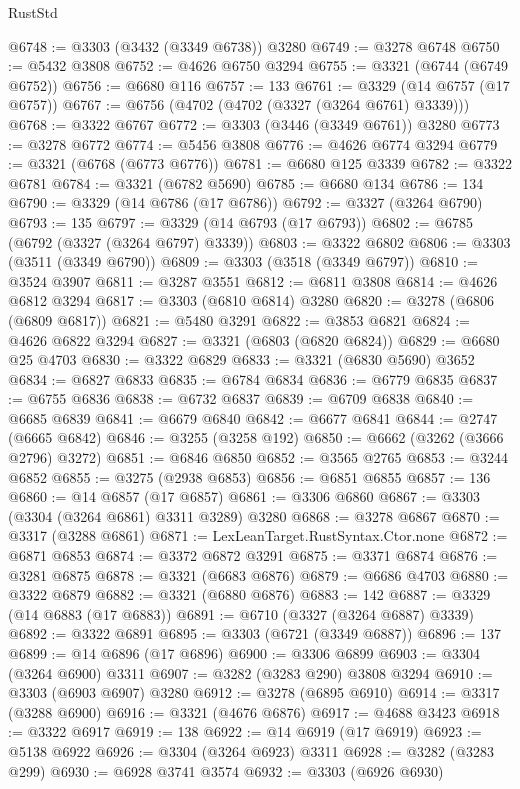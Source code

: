 \begin{lexlean}{RustStd}
\begin{coremodule}
{\begin{coremodule}
{{{{{{{{{{{{{{{{{{{{{{{{{{{{{{{{{@6748 := @3303 (@3432 (@3349 @6738)) @3280
@6749 := @3278 @6748
@6750 := @5432 @3808
@6752 := @4626 @6750 @3294
@6755 := @3321 (@6744 (@6749 @6752))
@6756 := @6680 @116
@6757 := 133
@6761 := @3329 (@14 @6757 (@17 @6757))
@6767 := @6756 (@4702 (@4702 (@3327 (@3264 @6761) @3339)))
@6768 := @3322 @6767
@6772 := @3303 (@3446 (@3349 @6761)) @3280
@6773 := @3278 @6772
@6774 := @5456 @3808
@6776 := @4626 @6774 @3294
@6779 := @3321 (@6768 (@6773 @6776))
@6781 := @6680 @125 @3339
@6782 := @3322 @6781
@6784 := @3321 (@6782 @5690)
@6785 := @6680 @134
@6786 := 134
@6790 := @3329 (@14 @6786 (@17 @6786))
@6792 := @3327 (@3264 @6790)
@6793 := 135
@6797 := @3329 (@14 @6793 (@17 @6793))
@6802 := @6785 (@6792 (@3327 (@3264 @6797) @3339))
@6803 := @3322 @6802
@6806 := @3303 (@3511 (@3349 @6790))
@6809 := @3303 (@3518 (@3349 @6797))
@6810 := @3524 @3907
@6811 := @3287 @3551
@6812 := @6811 @3808
@6814 := @4626 @6812 @3294
@6817 := @3303 (@6810 @6814) @3280
@6820 := @3278 (@6806 (@6809 @6817))
@6821 := @5480 @3291
@6822 := @3853 @6821
@6824 := @4626 @6822 @3294
@6827 := @3321 (@6803 (@6820 @6824))
@6829 := @6680 @25 @4703
@6830 := @3322 @6829
@6833 := @3321 (@6830 @5690) @3652
@6834 := @6827 @6833
@6835 := @6784 @6834
@6836 := @6779 @6835
@6837 := @6755 @6836
@6838 := @6732 @6837
@6839 := @6709 @6838
@6840 := @6685 @6839
@6841 := @6679 @6840
@6842 := @6677 @6841
@6844 := @2747 (@6665 @6842)
@6846 := @3255 (@3258 @192)
@6850 := @6662 (@3262 (@3666 @2796) @3272)
@6851 := @6846 @6850
@6852 := @3565 @2765
@6853 := @3244 @6852
@6855 := @3275 (@2938 @6853)
@6856 := @6851 @6855
@6857 := 136
@6860 := @14 @6857 (@17 @6857)
@6861 := @3306 @6860
@6867 := @3303 (@3304 (@3264 @6861) @3311 @3289) @3280
@6868 := @3278 @6867
@6870 := @3317 (@3288 @6861)
@6871 := LexLeanTarget.RustSyntax.Ctor.none
@6872 := @6871 @6853
@6874 := @3372 @6872 @3291
@6875 := @3371 @6874
@6876 := @3281 @6875
@6878 := @3321 (@6683 @6876)
@6879 := @6686 @4703
@6880 := @3322 @6879
@6882 := @3321 (@6880 @6876)
@6883 := 142
@6887 := @3329 (@14 @6883 (@17 @6883))
@6891 := @6710 (@3327 (@3264 @6887) @3339)
@6892 := @3322 @6891
@6895 := @3303 (@6721 (@3349 @6887))
@6896 := 137
@6899 := @14 @6896 (@17 @6896)
@6900 := @3306 @6899
@6903 := @3304 (@3264 @6900) @3311
@6907 := @3282 (@3283 @290) @3808 @3294
@6910 := @3303 (@6903 @6907) @3280
@6912 := @3278 (@6895 @6910)
@6914 := @3317 (@3288 @6900)
@6916 := @3321 (@4676 @6876)
@6917 := @4688 @3423
@6918 := @3322 @6917
@6919 := 138
@6922 := @14 @6919 (@17 @6919)
@6923 := @5138 @6922
@6926 := @3304 (@3264 @6923) @3311
@6928 := @3282 (@3283 @299)
@6930 := @6928 @3741 @3574
@6932 := @3303 (@6926 @6930)
}}}}}}}}}}}}}}}}}}}}}}}}}}}}}}}}}
\end{coremodule}}
\end{coremodule}
\end{lexlean}
